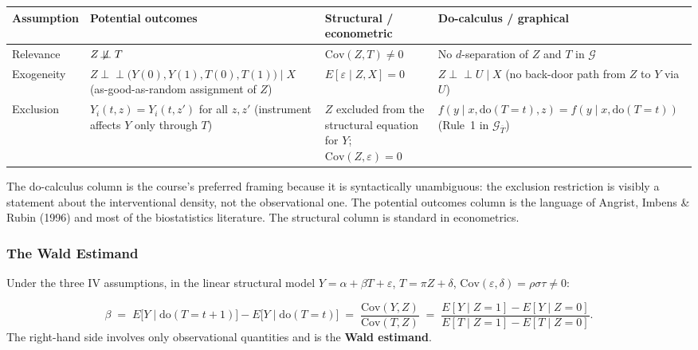 \documentclass[12pt]{article}
\begin{document}
\begin{center}
\renewcommand{\arraystretch}{1.6}
\small
\begin{tabular}{@{}p{2.2cm} p{4.0cm} p{4.0cm} p{4.0cm}@{}}
  \toprule
  \textbf{Assumption}
    & \textbf{Potential outcomes}
    & \textbf{Structural / econometric}
    & \textbf{Do-calculus / graphical} \\
  \midrule
  Relevance
    & $Z \not\!\perp\!\!\!\perp T$
    & $\mathrm{Cov}(Z, T) \neq 0$
    & No $d$-separation of $Z$ and $T$ in $\mathcal{G}$ \\
  Exogeneity
    & $Z \perp\!\!\!\perp \bigl(Y(0), Y(1), T(0), T(1)\bigr) \mid X$
      (as-good-as-random assignment of $Z$)
    & $E[\varepsilon \mid Z, X] = 0$
    & $Z \perp\!\!\!\perp U \mid X$
      (no back-door path from $Z$ to $Y$ via $U$) \\
  Exclusion
    & $Y_i(t, z) = Y_i(t, z')$ for all $z, z'$
      (instrument affects $Y$ only through $T$)
    & $Z$ excluded from the structural equation for $Y$;
      $\mathrm{Cov}(Z, \varepsilon) = 0$
    & $f(y \mid x, \mathrm{do}(T{=}t), z)
       = f(y \mid x, \mathrm{do}(T{=}t))$
       (Rule~1 in $\mathcal{G}_{\overline{T}}$) \\
  \bottomrule
\end{tabular}
\end{center}

\medskip
The do-calculus column is the course's preferred framing because it is
syntactically unambiguous: the exclusion restriction is visibly a statement
about the interventional density, not the observational one.  The potential
outcomes column is the language of Angrist, Imbens \& Rubin (1996) and most
of the biostatistics literature.  The structural column is standard in
econometrics.

\subsubsection*{The Wald Estimand}

Under the three IV assumptions, in the linear structural model
$Y = \alpha + \beta T + \varepsilon$, $T = \pi Z + \delta$,
$\mathrm{Cov}(\varepsilon, \delta) = \rho\sigma\tau \neq 0$:

\begin{keybox}
\[
  \beta
  \;=\; E\!\bigl[Y \mid \mathrm{do}(T{=}t{+}1)\bigr]
        - E\!\bigl[Y \mid \mathrm{do}(T{=}t)\bigr]
  \;=\; \frac{\mathrm{Cov}(Y, Z)}{\mathrm{Cov}(T, Z)}
  \;=\; \frac{E[Y \mid Z{=}1] - E[Y \mid Z{=}0]}
             {E[T \mid Z{=}1] - E[T \mid Z{=}0]}.
\]
The right-hand side involves only observational quantities and is the
\textbf{Wald estimand}.
\end{keybox}
\end{document}

